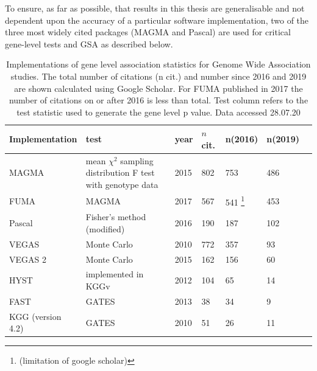 To ensure, as far as possible, that results in this thesis are generalisable and not dependent upon the accuracy of a particular software implementation, two of the three most widely cited packages (MAGMA\cite{de2015magma} and Pascal\cite{lamparter2016fast}) are used for critical gene-level tests and GSA as described below. 




\begin{table}[]
    \centering
    \begin{tabular}{lllllll}
        \toprule
    Implementation  & test  & year &  $n$ cit. & n(2016) & n(2019)  \\
 \midrule
  MAGMA \cite{de2015magma} & \makecell{mean $\chi^2$ sampling distribution \\ F test with genotype data}  & 2015 & 802 & 753 & 486 \\
   FUMA \cite{watanabe2017functional} & MAGMA & 2017 & 567 & 541 \footnote{(limitation of google scholar)} & 453 \\
    Pascal \cite{lamparter2016fast} & Fisher's method (modified) & 2016 & 190 & 187 & 102 \\
   VEGAS \cite{liu2010versatile} & Monte Carlo & 2010& 772 & 357 & 93 \\
    VEGAS 2 \cite{mishra2015vegas2} & Monte Carlo & 2015 & 162 & 156 & 60 \\
    HYST & implemented in KGGv\cite{li2010knowledge} & 2012 & 104 & 65 & 14\\
    FAST & GATES & 2013 & 38 & 34 & 9 \\
     KGG (version 4.2) \cite{li2010knowledge} & GATES &   2010 &      51 & 26 & 11 \\
    \bottomrule
    \end{tabular}
    \caption[Gene level association tests for GWAS studies]{Implementations of gene level association statistics for Genome Wide Association studies. The total number of citations (n cit.) and number since 2016 and 2019 are shown calculated using Google Scholar.  For FUMA published in 2017 the number of citations on or after 2016 is less than total. Test column refers to the test statistic used to generate the gene level p value. Data accessed 28.07.20}
    \label{tab:gene_level_tests}
\end{table}

